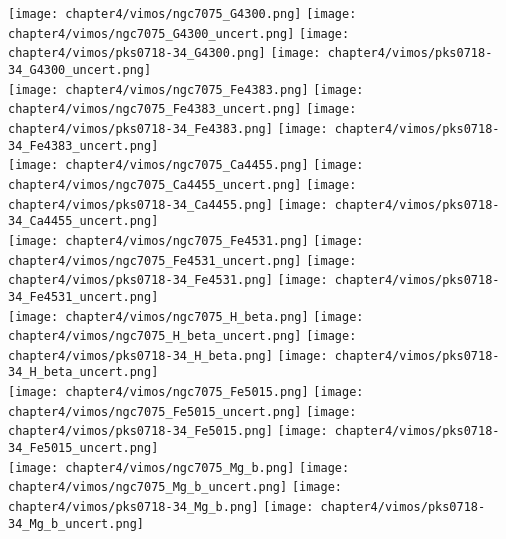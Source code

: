 \begin{figure*}
	\centering
	\texttt{[image: chapter4/vimos/ngc7075\_G4300.png]}
	\texttt{[image: chapter4/vimos/ngc7075\_G4300\_uncert.png]}
	\texttt{[image: chapter4/vimos/pks0718-34\_G4300.png]}
	\texttt{[image: chapter4/vimos/pks0718-34\_G4300\_uncert.png]}
	\\
	\texttt{[image: chapter4/vimos/ngc7075\_Fe4383.png]}
	\texttt{[image: chapter4/vimos/ngc7075\_Fe4383\_uncert.png]}
	\texttt{[image: chapter4/vimos/pks0718-34\_Fe4383.png]}
	\texttt{[image: chapter4/vimos/pks0718-34\_Fe4383\_uncert.png]}
	\\
	\texttt{[image: chapter4/vimos/ngc7075\_Ca4455.png]}
	\texttt{[image: chapter4/vimos/ngc7075\_Ca4455\_uncert.png]}
	\texttt{[image: chapter4/vimos/pks0718-34\_Ca4455.png]}
	\texttt{[image: chapter4/vimos/pks0718-34\_Ca4455\_uncert.png]}
	\\
	\texttt{[image: chapter4/vimos/ngc7075\_Fe4531.png]}
	\texttt{[image: chapter4/vimos/ngc7075\_Fe4531\_uncert.png]}
	\texttt{[image: chapter4/vimos/pks0718-34\_Fe4531.png]}
	\texttt{[image: chapter4/vimos/pks0718-34\_Fe4531\_uncert.png]}
	\\
	\texttt{[image: chapter4/vimos/ngc7075\_H\_beta.png]}
	\texttt{[image: chapter4/vimos/ngc7075\_H\_beta\_uncert.png]}
	\texttt{[image: chapter4/vimos/pks0718-34\_H\_beta.png]}
	\texttt{[image: chapter4/vimos/pks0718-34\_H\_beta\_uncert.png]}
	\\
	\texttt{[image: chapter4/vimos/ngc7075\_Fe5015.png]}
	\texttt{[image: chapter4/vimos/ngc7075\_Fe5015\_uncert.png]}
	\texttt{[image: chapter4/vimos/pks0718-34\_Fe5015.png]}
	\texttt{[image: chapter4/vimos/pks0718-34\_Fe5015\_uncert.png]}
	\\
	\texttt{[image: chapter4/vimos/ngc7075\_Mg\_b.png]}
	\texttt{[image: chapter4/vimos/ngc7075\_Mg\_b\_uncert.png]}
	\texttt{[image: chapter4/vimos/pks0718-34\_Mg\_b.png]}
	\texttt{[image: chapter4/vimos/pks0718-34\_Mg\_b\_uncert.png]}
	\\
\end{figure*}


